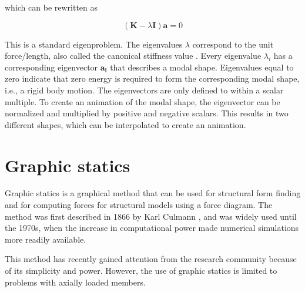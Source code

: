 which can be rewritten as

\begin{equation*}
(\mathbf{K} - \lambda \mathbf{I})\mathbf{a} = 0
\end{equation*}

This is a standard eigenproblem. The eigenvalues   $\lambda$ correspond to the unit force/length, also called the canonical stiffness value \cite{Olsson2006}. Every eigenvalue  $\lambda_i$ has a corresponding eigenvector   $\mathbf{a_i}$ that describes a modal shape. Eigenvalues equal to zero indicate that zero energy is required to form the corresponding modal shape, i.e., a rigid body motion. The eigenvectors are only defined to within a scalar multiple. To create an animation of the modal shape, the eigenvector can be normalized and multiplied by positive and negative scalars. This results in two different shapes, which can be interpolated to create an animation.


\section{Graphic statics}
Graphic statics is a graphical method that can be used for structural form finding and for computing forces for structural models using a force diagram. The method was first described in 1866 by Karl Culmann \cite{Culmann1866}, and was widely used until the 1970s, when the increase in computational power made numerical simulations more readily available. 

This method has recently gained attention from the research community \cite{Todisco2015, Block, Fivet2013} because of its simplicity and power. However, the use of graphic statics is limited to problems with axially loaded members. 

